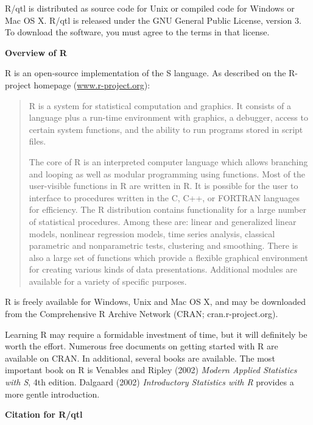 \documentclass[10pt,letterpaper]{article}
\begin{document}
R/qtl is distributed as source code for Unix or compiled code for
Windows or Mac OS X.  R/qtl is released under the GNU General Public
License, version 3. To download the software, you must agree to the
terms in that license.


\vspace{12pt}
\noindent \textbf{Overview of R} \vspace{6pt}

R is an open-source implementation of the S language. As described on
the R-project homepage
(\href{http://www.r-project.org}{www.r-project.org}):

\begin{quote}
R is a system for statistical computation and graphics.  It consists
of a language plus a run-time environment with graphics, a debugger,
access to certain system functions, and the ability to run programs
stored in script files.

The core of R is an interpreted computer language which allows
branching and looping as well as modular programming using
functions. Most of the user-visible functions in R are written in
R. It is possible for the user to interface to procedures written in
the C, C++, or FORTRAN languages for efficiency. The R distribution
contains functionality for a large number of statistical
procedures. Among these are: linear and generalized linear models,
nonlinear regression models, time series analysis, classical
parametric and nonparametric tests, clustering and smoothing. There is
also a large set of functions which provide a flexible graphical
environment for creating various kinds of data
presentations. Additional modules are available for a variety of
specific purposes.
\end{quote} 

R is freely available for Windows, Unix and Mac OS X, and may be
downloaded from the Comprehensive R Archive Network (CRAN;
cran.r-project.org).

Learning R may require a formidable investment of time, but it will
definitely be worth the effort. Numerous free documents on getting
started with R are available on CRAN. In additional, several books are
available.  The most important book on R is Venables and Ripley (2002)
\emph{Modern Applied Statistics with S}, 4th
edition. Dalgaard (2002) \emph{Introductory Statistics with
  R} provides a more gentle introduction.


\vspace{12pt}
\noindent \textbf{Citation for R/qtl} \vspace{6pt}
\end{document}
